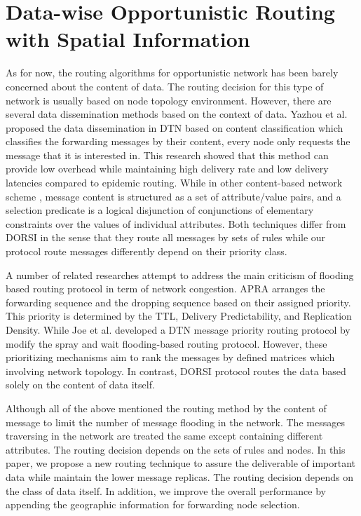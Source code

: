 \chapter{Data-wise Opportunistic Routing with Spatial Information}
\label{DORSI}
As for now, the routing algorithms for opportunistic network has been barely concerned about the content of data. 
The routing decision for this type of network is usually based on node topology environment. 
However, there are several data dissemination methods based on the context of data. 
Yazhou et al. \cite{Jiao2009} proposed the data dissemination in DTN based on content classification which classifies the forwarding messages by their content, every node only requests the message that it is interested in. 
This research showed that this method can provide low overhead while maintaining high delivery rate and low delivery latencies compared to epidemic routing. 
While in other content-based network scheme \cite{Carzaniga2004}, message content is structured as a set of attribute/value pairs, and a selection predicate is a logical disjunction of conjunctions of elementary constraints over the values of individual attributes. 
Both techniques differ from DORSI in the sense that they route all messages by sets of rules while our protocol route messages differently depend on their priority class.

A number of related researches attempt to address the main criticism of flooding based routing protocol in term of network congestion. 
APRA \cite{Jin2009} arranges the forwarding sequence and the dropping sequence based on their assigned priority. 
This priority is determined by the TTL, Delivery Predictability, and Replication Density. 
While Joe et al. \cite{Joe2010} developed a DTN message priority routing protocol by modify the spray and wait \cite{Spyropoulos2005} flooding-based routing protocol. 
However, these prioritizing mechanisms aim to rank the messages by defined matrices which involving network topology. 
In contrast, DORSI protocol routes the data based solely on the content of data itself.

Although all of the above mentioned the routing method by the content of message to limit the number of message flooding in the network. The messages traversing in the network are treated the same except containing different attributes. The routing decision depends on the sets of rules and nodes. In this paper, we propose a new routing technique to assure the deliverable of important data while maintain the lower message replicas. The routing decision depends on the class of data itself. In addition, we improve the overall performance by appending the geographic information for forwarding node selection.

